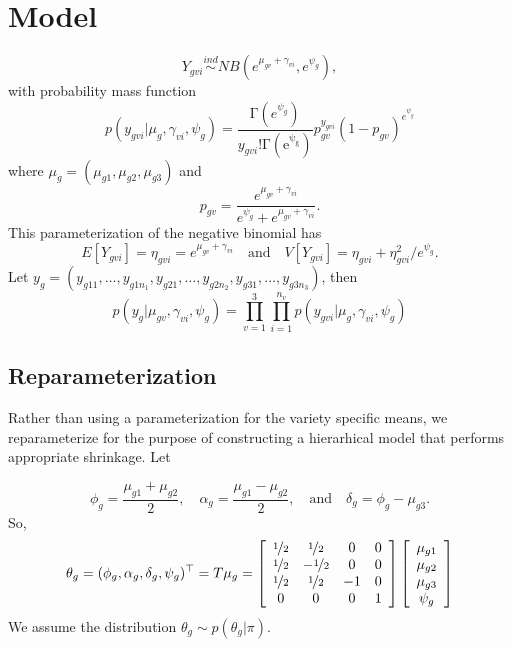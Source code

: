 \documentclass{article}
\newcommand{\mGamma}{\mathrm{\Gamma}}
\begin{document}
\section{Model}
\begin{equation} 
Y_{gvi} \stackrel{ind}{\sim} NB\left(e^{\mu_{gv}+\gamma_{vi}},e^{\psi_g}\right), 
\label{e:data}
\end{equation}
with probability mass function 
\[ p(y_{gvi}|\mu_{g},\gamma_{vi},\psi_g) =\frac{\mGamma(e^{\psi_g})}{y_{gvi}!\mathrm{\Gamma(e^{\psi_g})}}  p_{gv}^{y_{gvi}}(1-p_{gv})^{e^{\psi_g}} \] 
where $\mu_g = (\mu_{g1},\mu_{g2},\mu_{g3})$ and 
\[ p_{gv} = \frac{e^{\mu_{gv}+\gamma_{vi}}}{e^{\psi_g}+e^{\mu_{gv}+\gamma_{vi}}}. \]
This parameterization of the negative binomial has 
\[ E[Y_{gvi}] = \eta_{gvi} =e^{\mu_{gv}+\gamma_{vi}} \quad \mbox{and} \quad V[Y_{gvi}] = \eta_{gvi} + \eta_{gvi}^2/e^{\psi_g}. \]
Let $y_{g} = (y_{g11},\ldots,y_{g1n_1},y_{g21},\ldots,y_{g2n_2},y_{g31},\ldots,y_{g3n_3})$, then 
\[ 
p(y_g|\mu_{gv} ,\gamma_{vi}, \psi_g) = \prod_{v=1}^3 \prod_{i=1}^{n_v} p(y_{gvi}|\mu_{g},\gamma_{vi},\psi_g) 
\] 

\subsection{Reparameterization}

Rather than using a parameterization for the variety specific means, we reparameterize for the purpose of constructing a hierarhical model that performs appropriate shrinkage. Let 

\[ \phi_g = \frac{\mu_{g1}+\mu_{g2}}{2}, \quad 
\alpha_g = \frac{\mu_{g1}-\mu_{g2}}{2}, \quad \mbox{and} \quad
\delta_g = \phi_g-\mu_{g3}. \]
So, 
\[ \theta_g = (\phi_g,\alpha_g,\delta_g,\psi_g)^\top = T \mu_g = 
\left[ \begin{array}{cccc}
\nicefrac{1}{2} & \nicefrac{1}{2} & 0 & 0 \\
\nicefrac{1}{2} & -\nicefrac{1}{2} & 0 & 0\\
\nicefrac{1}{2} & \nicefrac{1}{2} & -1 & 0\\
0 & 0 & 0 & 1\\
\end{array}\right] \left[ \begin{array}{c}
\mu_{g1} \\ \mu_{g2} \\ \mu_{g3} \\ \psi_g 
\end{array} \right]
\]
We assume the distribution $\theta_g \sim p(\theta_g|\pi)$. 
\end{document}

